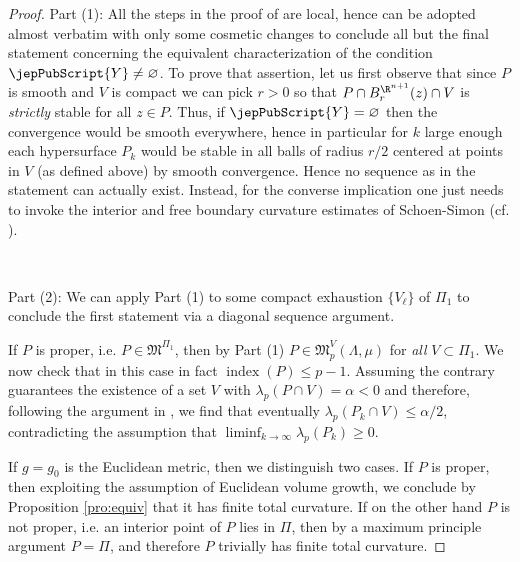        	 	\begin{proof}
        	 		Part (1):        		 All the steps in the proof of \cite[Th.~29]{ACS17} are local, hence can be adopted almost verbatim with only some cosmetic changes to conclude all but the final statement concerning the equivalent characterization of the condition ${\jepPubScript{Y}}\neq\varnothing$. To prove that assertion, let us first observe that since $P$ is smooth and $V$ is compact we can pick $r>0$ so that $P\cap B^{\R^{n+1}}_r(z)\cap V$ is \emph{strictly} stable for all $z\in P$. Thus, if ${\jepPubScript{Y}}=\varnothing$ then the convergence would be smooth everywhere, hence in particular for $k$ large enough each hypersurface $P_k$ would be stable in all balls of radius $r/2$ centered at points in $V$ (as defined above) by smooth convergence. Hence no sequence as in the statement can actually exist. Instead, for the converse implication one just needs to invoke the interior and free boundary curvature estimates of Schoen-Simon \cite{SS81} (cf. \cite[Th.~19]{ACS17}).  
        	 		
        	 		\
        	 		
        	 		Part (2):
        	 		We can apply Part (1) to some compact exhaustion $\{V_{\ell}\}$ of $\Pi_1$ to conclude the first statement via a diagonal sequence argument.%
        	 		
        	 		If $P$ is proper, i.e. $P \in \mathfrak{M}^{\Pi_1}$, then by Part (1) $P\in \mathfrak{M}^V_p(\Lambda, \mu)$ for \emph{all} $V \subset \Pi_1$. We now check that in this case in fact $\operatorname{index}(P)\leqslant p-1$. Assuming the contrary guarantees the existence of a set $V$ with $\lambda_p(P\cap V)=\alpha<0$ and therefore, following the argument in \cite[p.~2599--2600]{ACS15}, we find that eventually $\lambda_p(P_k\cap V)\leqslant \alpha/2$, contradicting the assumption that $\liminf_{k\to\infty}\lambda_p(P_k)\geqslant 0$.  
        	 		
        	 		If $g=g_0$ is the Euclidean metric, then we distinguish two cases. If $P$ is proper, then exploiting the assumption of Euclidean volume growth, we conclude by Proposition \ref{pro:equiv} that it has finite total curvature. If on the other hand $P$ is not proper, i.e. an interior point of $P$ lies in $\Pi$, then by a maximum principle argument $P=\Pi$, and therefore $P$ trivially has finite total curvature. 
        	 		

\end{proof}
